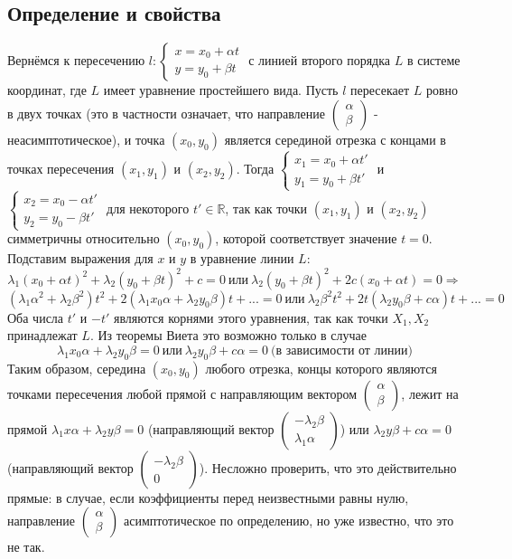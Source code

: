 \documentclass[a4paper, 12pt]{article}
\theoremstyle{definition}
\begin{document}
	\subsection{Определение и свойства}
	Вернёмся к пересечению $l: \begin{cases}
		x = x_0 + \alpha t\\
		y = y_0 + \beta t
		\end{cases}$
		с линией второго порядка $L$ в системе координат, где $L$ имеет уравнение простейшего вида. Пусть $l$ пересекает $L$ ровно в двух точках (это в частности означает, что направление $\begin{pmatrix} \alpha \\ \beta \end{pmatrix}$ - неасимптотическое), и точка $(x_0, y_0)$ является серединой отрезка с концами в точках пересечения $(x_1, y_1)$ и $(x_2, y_2)$. Тогда $\begin{cases}
			x_1 = x_0 + \alpha t'\\
			y_1 = y_0 + \beta t'
		\end{cases}$ и $
		\begin{cases}
			x_2 = x_0 - \alpha t'\\
			y_2 = y_0 - \beta t'
		\end{cases}$
		для некоторого $t' \in \mathbb{R}$, так как точки $(x_1, y_1)$ и $(x_2, y_2)$ симметричны относительно $(x_0, y_0)$, которой соответствует значение $t = 0$.\\
		Подставим выражения для $x$ и $y$ в уравнение линии $L$: $$\lambda_1(x_0 + \alpha t)^2 + \lambda_2(y_0 + \beta t)^2 + c = 0\ \text{или} \ \lambda_2(y_0 + \beta t)^2 + 2c(x_0 + \alpha t) = 0 \Rightarrow$$$$(\lambda_1\alpha^2 + \lambda_2\beta^2)t^2 + 2(\lambda_1x_0\alpha + \lambda_2y_0\beta)t + ... = 0 \ \text{или} \ \lambda_2\beta^2t^2 + 2t(\lambda_2y_0\beta + c\alpha)t + ... = 0$$
		Оба числа $t'$ и $-t'$ являются корнями этого уравнения, так как точки $X_1, X_2$ принадлежат $L$. Из теоремы Виета это возможно только в случае $$\lambda_1x_0\alpha + \lambda_2y_0\beta = 0 \ \text{или} \ \lambda_2y_0\beta + c\alpha = 0 \ \text{(в зависимости от линии)}$$
		Таким образом, середина $(x_0, y_0)$ любого отрезка, концы которого являются точками пересечения любой прямой с направляющим вектором $\begin{pmatrix} \alpha \\ \beta \end{pmatrix}$, лежит на прямой $\lambda_1x\alpha + \lambda_2y\beta = 0$ (направляющий вектор $\begin{pmatrix} -\lambda_2\beta \\ \lambda_1\alpha \end{pmatrix}$) или $\lambda_2y\beta + c\alpha = 0$ (направляющий вектор $\begin{pmatrix} -\lambda_2\beta \\ 0 \end{pmatrix}$). Несложно проверить, что это действительно прямые: в случае, если коэффициенты перед неизвестными равны нулю, направление $\begin{pmatrix} \alpha \\ \beta \end{pmatrix}$ асимптотическое по определению, но уже известно, что это не так.\\
\end{document}
